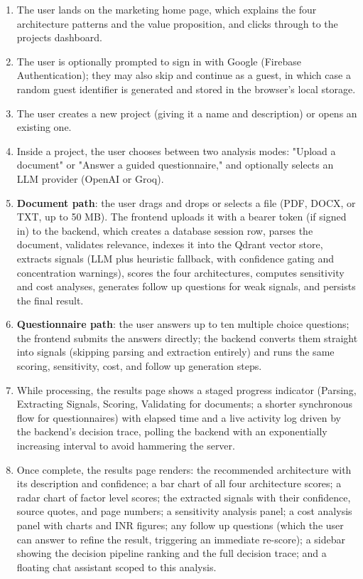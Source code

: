\documentclass[11pt,a4paper]{report}
\begin{document}
\begin{enumerate}[leftmargin=*]
  \item The user lands on the marketing home page, which explains the four architecture patterns and the value proposition, and clicks through to the projects dashboard.
  \item The user is optionally prompted to sign in with Google (Firebase Authentication); they may also skip and continue as a guest, in which case a random guest identifier is generated and stored in the browser's local storage.
  \item The user creates a new project (giving it a name and description) or opens an existing one.
  \item Inside a project, the user chooses between two analysis modes: "Upload a document" or "Answer a guided questionnaire," and optionally selects an LLM provider (OpenAI or Groq).
  \item \textbf{Document path}: the user drags and drops or selects a file (PDF, DOCX, or TXT, up to 50 MB). The frontend uploads it with a bearer token (if signed in) to the backend, which creates a database session row, parses the document, validates relevance, indexes it into the Qdrant vector store, extracts signals (LLM plus heuristic fallback, with confidence gating and concentration warnings), scores the four architectures, computes sensitivity and cost analyses, generates follow up questions for weak signals, and persists the final result.
  \item \textbf{Questionnaire path}: the user answers up to ten multiple choice questions; the frontend submits the answers directly; the backend converts them straight into signals (skipping parsing and extraction entirely) and runs the same scoring, sensitivity, cost, and follow up generation steps.
  \item While processing, the results page shows a staged progress indicator (Parsing, Extracting Signals, Scoring, Validating for documents; a shorter synchronous flow for questionnaires) with elapsed time and a live activity log driven by the backend's decision trace, polling the backend with an exponentially increasing interval to avoid hammering the server.
  \item Once complete, the results page renders: the recommended architecture with its description and confidence; a bar chart of all four architecture scores; a radar chart of factor level scores; the extracted signals with their confidence, source quotes, and page numbers; a sensitivity analysis panel; a cost analysis panel with charts and INR figures; any follow up questions (which the user can answer to refine the result, triggering an immediate re-score); a sidebar showing the decision pipeline ranking and the full decision trace; and a floating chat assistant scoped to this analysis.

\end{enumerate}
\end{document}
